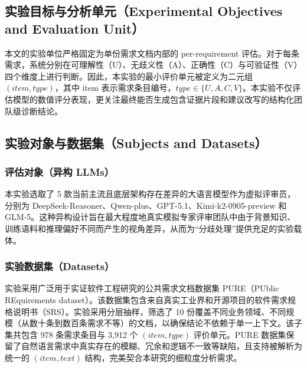 \documentclass[a4paper,11pt]{ctexart}
\begin{document}
\subsection{实验目标与分析单元（Experimental Objectives and Evaluation Unit）}
本文的实验单位严格固定为单份需求文档内部的 per-requirement 评估。对于每条需求，系统分别在可理解性（U）、无歧义性（A）、正确性（C）与可验证性（V）四个维度上进行判断。因此，本实验的最小评价单元被定义为二元组 $(item,type)$，其中 item 表示需求条目编号，$type\in\{U,A,C,V\}$。本实验不仅评估模型的数值评分表现，更关注最终能否生成包含证据片段和建议改写的结构化团队级诊断结论。

\subsection{实验对象与数据集（Subjects and Datasets）}
\subsubsection{评估对象（异构 LLMs）}
本实验选取了 5 款当前主流且底层架构存在差异的大语言模型作为虚拟评审员，分别为 DeepSeek-Reasoner、Qwen-plus、GPT-5.1、Kimi-k2-0905-preview 和 GLM-5。这种异构设计旨在最大程度地真实模拟专家评审团队中由于背景知识、训练语料和推理偏好不同而产生的视角差异，从而为“分歧处理”提供充足的实验载体。

\subsubsection{实验数据集（Datasets）}
\label{sec:datasets}
实验采用广泛用于实证软件工程研究的公共需求文档数据集 PURE（PUblic REquirements dataset）。该数据集包含来自真实工业界和开源项目的软件需求规格说明书（SRS）。实验采用分层抽样，筛选了 10 份覆盖不同业务领域、不同规模（从数十条到数百条需求不等）的文档，以确保结论不依赖于单一上下文。该子集共包含 978 条需求条目与 3,912 个 $(item,type)$ 评价单元。PURE 数据集保留了自然语言需求中真实存在的模糊、冗余和逻辑不一致等缺陷，且支持被解析为统一的 $(item, text)$ 结构，完美契合本研究的细粒度分析需求。


\end{document}
